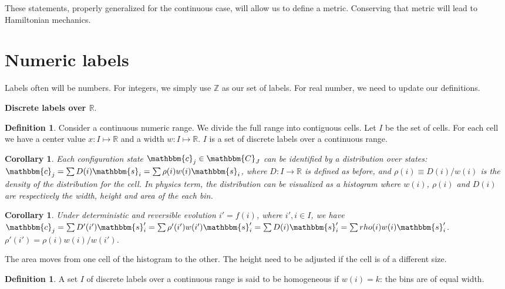 \documentclass[twocolumn,floatfix,nofootinbib]{revtex4}   %
\theoremstyle{theorem}
\newtheorem{cor}[thm]{Corollary}
\theoremstyle{definition}
\newtheorem{defn}[thm]{Definition}
\begin{document}
These statements, properly generalized for the continuous case, will allow us to define a metric. Conserving that metric will lead to Hamiltonian mechanics.

\section{Numeric labels}

Labels often will be numbers. For integers, we simply use $\mathbb{Z}$ as our set of labels. For real number, we need to update our definitions.

\textbf{Discrete labels over $\mathbb{R}$}.

\begin{defn}\label{disclabelsoverr}
Consider a continuous numeric range. We divide the full range into contiguous cells. Let $I$ be the set of cells. For each cell we have a center value $x: I \mapsto \mathbb{R}$ and a width $w: I \mapsto \mathbb{R}$. $I$ is a set of discrete labels over a continuous range.
\end{defn}

\begin{cor}\label{disclabelsoverrdist}
Each configuration state $\mathbbm{c}_j \in \mathbbm{C}_J$ can be identified by a distribution over states: $\mathbbm{c}_j=\sum D(i) \mathbbm{s}_i=\sum \rho(i) w(i) \mathbbm{s}_i$, where $D:I\rightarrow\mathbb{R}$ is defined as before, and $\rho(i)\equiv D(i) / w(i)$ is the density of the distribution for the cell. In physics term, the distribution can be visualized as a histogram where $w(i)$, $\rho(i)$ and $D(i)$ are respectively the width, height and area of the each bin.
\end{cor}

\begin{cor}\label{discreteEv}
Under deterministic and reversible evolution $i' = f(i)$, where $i', i \in I$, we have $\mathbbm{c}_j=\sum D'(i') \mathbbm{s}_i'=\sum \rho'(i') w(i') \mathbbm{s}_i' = \sum D(i) \mathbbm{s}_i' = \sum rho(i) w(i) \mathbbm{s}_i'$. $\rho'(i') = \rho(i) w(i) / w(i')$.
\end{cor}

The area moves from one cell of the histogram to the other. The height need to be adjusted if the cell is of a different size.

\begin{defn}\label{discreteHomogeneous}
A set $I$ of discrete labels over a continuous range is said to be homogeneous if $w(i)=k$: the bins are of equal width.
\end{defn}
\end{document}
